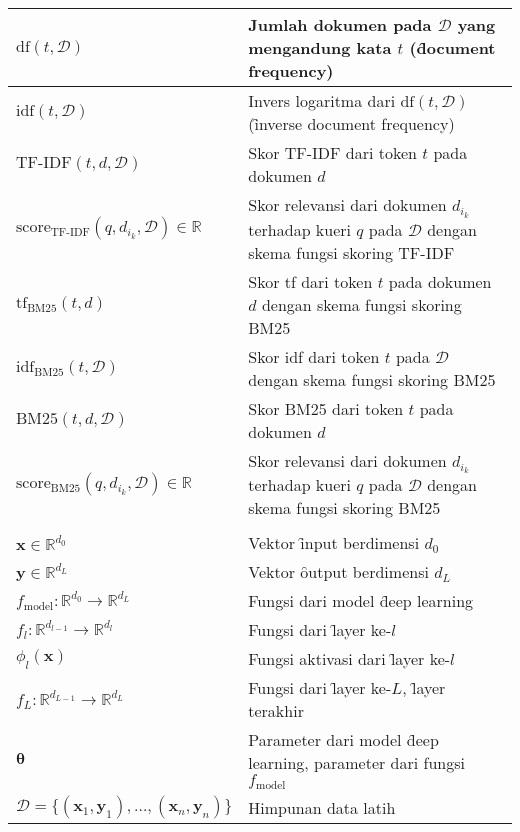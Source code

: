 \begin{longtable*}{| P{0.3\textwidth} |  P{0.7\textwidth} |}
    $\text{df}(t, \mathcal{D})$ & Jumlah dokumen pada $\mathcal{D}$ yang mengandung kata $t$ (\f{document frequency}) \\ \hline
    $\text{idf}(t, \mathcal{D})$ & Invers logaritma dari $\text{df}(t, \mathcal{D})$ (\f{inverse document frequency}) \\ \hline
    $\text{TF-IDF}(t, d, \mathcal{D})$ & Skor TF-IDF dari token $t$ pada dokumen $d$ \\ \hline
    $\text{score}_{\text{TF-IDF}}(q, d_{i_k},\mathcal{D}) \in \mathbb{R}$ & Skor relevansi dari dokumen $d_{i_k}$ terhadap kueri $q$ pada $\mathcal{D}$ dengan skema fungsi skoring TF-IDF \\ \hline
    $\text{tf}_{\text{BM25}}(t, d)$ & Skor tf dari token $t$ pada dokumen $d$ dengan skema fungsi skoring BM25 \\ \hline
    $\text{idf}_{\text{BM25}}(t, \mathcal{D})$ & Skor idf dari token $t$ pada $\mathcal{D}$ dengan skema fungsi skoring BM25 \\ \hline
    $\text{BM25}(t, d, \mathcal{D})$ & Skor BM25 dari token $t$ pada dokumen $d$ \\ \hline
    $\text{score}_{\text{BM25}}(q, d_{i_k},\mathcal{D}) \in \mathbb{R}$ & Skor relevansi dari dokumen $d_{i_k}$ terhadap kueri $q$ pada $\mathcal{D}$ dengan skema fungsi skoring BM25 \\ \hline
     \\ \hline
    $\mathbf{x} \in \mathbb{R}^{d_{0}}$ & Vektor \f{input} berdimensi $d_0$ \\ \hline
    $\mathbf{y} \in \mathbb{R}^{d_{L}}$ & Vektor \f{output} berdimensi $d_L$ \\ \hline
    $f_\text{model}: \mathbb{R}^{d_{0}} \rightarrow \mathbb{R}^{d_{L}}$ & Fungsi dari model \f{deep learning} \\ \hline
    $f_l: \mathbb{R}^{d_{l-1}} \rightarrow \mathbb{R}^{d_l}$ & Fungsi dari \f{layer} ke-$l$ \\ \hline
    $\phi_l(\mathbf{x})$ & Fungsi aktivasi dari \f{layer} ke-$l$ \\ \hline
    $f_L: \mathbb{R}^{d_{L-1}} \rightarrow \mathbb{R}^{d_L}$ & Fungsi dari \f{layer} ke-$L$, \f{layer} terakhir \\ \hline
    $\bm{\theta}$ & Parameter dari model \f{deep learning}, parameter dari fungsi $f_\text{model}$ \\ \hline
    $\mathcal{D} = \{(\mathbf{x}_1, \mathbf{y}_1), \dots, (\mathbf{x}_n, \mathbf{y}_n)\}$ & Himpunan data latih \\ \hline

\end{longtable*}
